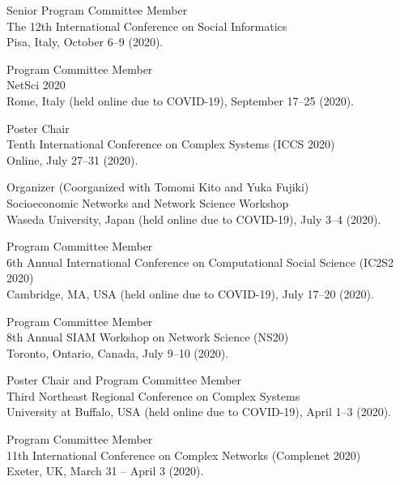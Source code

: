 \documentclass[11pt,letter]{article}
\renewenvironment{itemize}{
  \begin{list}{}{
    \setlength{\leftmargin}{1.5em}
    \setlength{\itemsep}{0.25em}
    \setlength{\parskip}{0pt}
    \setlength{\parsep}{0.25em}
  }
}{
  \end{list}
}
\begin{document}
\begin{itemize}
\item Senior Program Committee Member\\
The 12th International Conference on Social Informatics\\
Pisa, Italy, October 6--9 (2020).

\item Program Committee Member\\
NetSci 2020\\
Rome, Italy (held online due to COVID-19), September 17--25 (2020).

\item Poster Chair\\
Tenth International Conference on Complex Systems (ICCS 2020)\\
Online, July 27--31 (2020).

\item Organizer (Coorganized with Tomomi Kito and Yuka Fujiki)\\
Socioeconomic Networks and Network Science Workshop\\
Waseda University, Japan (held online due to COVID-19), July 3--4 (2020).

\item Program Committee Member\\
6th Annual International Conference on Computational Social Science (IC2S2 2020)\\
Cambridge, MA, USA (held online due to COVID-19), July 17--20 (2020).

\item Program Committee Member\\
8th Annual SIAM Workshop on Network Science (NS20)\\
Toronto, Ontario, Canada, July 9--10 (2020).

\item Poster Chair and Program Committee Member\\
Third Northeast Regional Conference on Complex Systems\\
University at Buffalo, USA (held online due to COVID-19), April 1--3 (2020).

\item Program Committee Member\\
11th International Conference on Complex Networks (Complenet 2020)\\
Exeter, UK, March 31 -- April 3 (2020).


\end{itemize}
\end{document}
